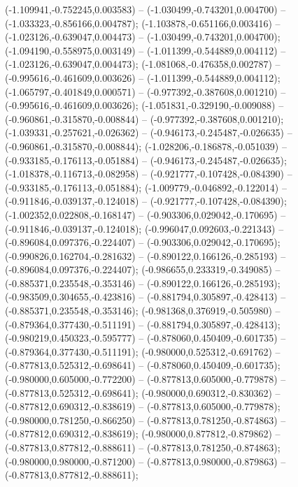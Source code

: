 (-1.109941,-0.752245,0.003583) -- (-1.030499,-0.743201,0.004700) -- (-1.033323,-0.856166,0.004787);
 (-1.103878,-0.651166,0.003416) -- (-1.023126,-0.639047,0.004473) -- (-1.030499,-0.743201,0.004700);
 (-1.094190,-0.558975,0.003149) -- (-1.011399,-0.544889,0.004112) -- (-1.023126,-0.639047,0.004473);
 (-1.081068,-0.476358,0.002787) -- (-0.995616,-0.461609,0.003626) -- (-1.011399,-0.544889,0.004112);
 (-1.065797,-0.401849,0.000571) -- (-0.977392,-0.387608,0.001210) -- (-0.995616,-0.461609,0.003626);
 (-1.051831,-0.329190,-0.009088) -- (-0.960861,-0.315870,-0.008844) -- (-0.977392,-0.387608,0.001210);
 (-1.039331,-0.257621,-0.026362) -- (-0.946173,-0.245487,-0.026635) -- (-0.960861,-0.315870,-0.008844);
 (-1.028206,-0.186878,-0.051039) -- (-0.933185,-0.176113,-0.051884) -- (-0.946173,-0.245487,-0.026635);
 (-1.018378,-0.116713,-0.082958) -- (-0.921777,-0.107428,-0.084390) -- (-0.933185,-0.176113,-0.051884);
 (-1.009779,-0.046892,-0.122014) -- (-0.911846,-0.039137,-0.124018) -- (-0.921777,-0.107428,-0.084390);
 (-1.002352,0.022808,-0.168147) -- (-0.903306,0.029042,-0.170695) -- (-0.911846,-0.039137,-0.124018);
 (-0.996047,0.092603,-0.221343) -- (-0.896084,0.097376,-0.224407) -- (-0.903306,0.029042,-0.170695);
 (-0.990826,0.162704,-0.281632) -- (-0.890122,0.166126,-0.285193) -- (-0.896084,0.097376,-0.224407);
 (-0.986655,0.233319,-0.349085) -- (-0.885371,0.235548,-0.353146) -- (-0.890122,0.166126,-0.285193);
 (-0.983509,0.304655,-0.423816) -- (-0.881794,0.305897,-0.428413) -- (-0.885371,0.235548,-0.353146);
 (-0.981368,0.376919,-0.505980) -- (-0.879364,0.377430,-0.511191) -- (-0.881794,0.305897,-0.428413);
 (-0.980219,0.450323,-0.595777) -- (-0.878060,0.450409,-0.601735) -- (-0.879364,0.377430,-0.511191);
 (-0.980000,0.525312,-0.691762) -- (-0.877813,0.525312,-0.698641) -- (-0.878060,0.450409,-0.601735);
 (-0.980000,0.605000,-0.772200) -- (-0.877813,0.605000,-0.779878) -- (-0.877813,0.525312,-0.698641);
 (-0.980000,0.690312,-0.830362) -- (-0.877812,0.690312,-0.838619) -- (-0.877813,0.605000,-0.779878);
 (-0.980000,0.781250,-0.866250) -- (-0.877813,0.781250,-0.874863) -- (-0.877812,0.690312,-0.838619);
 (-0.980000,0.877812,-0.879862) -- (-0.877813,0.877812,-0.888611) -- (-0.877813,0.781250,-0.874863);
 (-0.980000,0.980000,-0.871200) -- (-0.877813,0.980000,-0.879863) -- (-0.877813,0.877812,-0.888611);
